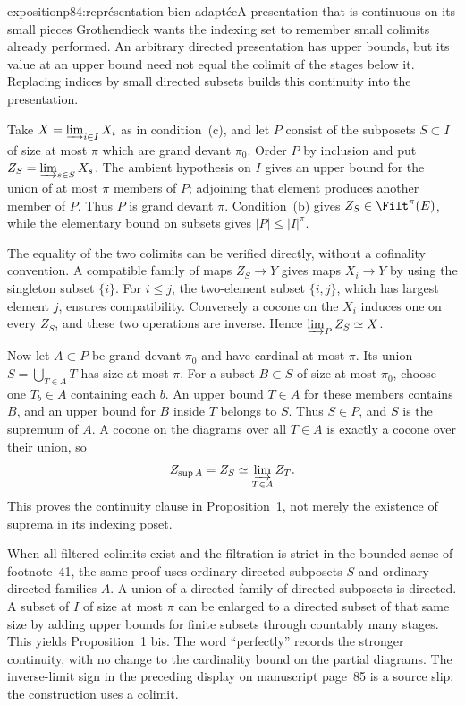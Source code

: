 \begin{dcomment}{exposition}{p84:représentation bien adaptée}{A presentation that is continuous on its small pieces}
Grothendieck wants the indexing set to remember small colimits already performed. An arbitrary directed presentation has upper bounds, but its value at an upper bound need not equal the colimit of the stages below it. Replacing indices by small directed subsets builds this continuity into the presentation.

Take $X=\varinjlim_{i\in I}X_i$ as in condition~(c), and let $P$ consist of the subposets $S\subset I$ of size at most $\pi$ which are grand devant $\pi_0$. Order $P$ by inclusion and put $Z_S=\varinjlim_{s\in S}X_s$. The ambient hypothesis on $I$ gives an upper bound for the union of at most $\pi$ members of $P$; adjoining that element produces another member of $P$. Thus $P$ is grand devant $\pi$. Condition~(b) gives $Z_S\in\Filt^\pi(E)$, while the elementary bound on subsets gives $|P|\leq|I|^\pi$.

The equality of the two colimits can be verified directly, without a cofinality convention. A compatible family of maps $Z_S\to Y$ gives maps $X_i\to Y$ by using the singleton subset $\{i\}$. For $i\leq j$, the two-element subset $\{i,j\}$, which has largest element $j$, ensures compatibility. Conversely a cocone on the $X_i$ induces one on every $Z_S$, and these two operations are inverse. Hence $\varinjlim_P Z_S\simeq X$.

Now let $A\subset P$ be grand devant $\pi_0$ and have cardinal at most $\pi$. Its union $S=\bigcup_{T\in A}T$ has size at most $\pi$. For a subset $B\subset S$ of size at most $\pi_0$, choose one $T_b\in A$ containing each $b$. An upper bound $T\in A$ for these members contains $B$, and an upper bound for $B$ inside $T$ belongs to $S$. Thus $S\in P$, and $S$ is the supremum of $A$. A cocone on the diagrams over all $T\in A$ is exactly a cocone over their union, so
\[
 Z_{\sup A}=Z_S\simeq\varinjlim_{T\in A}Z_T.
\]
This proves the continuity clause in Proposition~1, not merely the existence of suprema in its indexing poset.

When all filtered colimits exist and the filtration is strict in the bounded sense of footnote~41, the same proof uses ordinary directed subposets $S$ and ordinary directed families $A$. A union of a directed family of directed subposets is directed. A subset of $I$ of size at most $\pi$ can be enlarged to a directed subset of that same size by adding upper bounds for finite subsets through countably many stages. This yields Proposition~1 bis. The word ``perfectly'' records the stronger continuity, with no change to the cardinality bound on the partial diagrams. The inverse-limit sign in the preceding display on manuscript page~85 is a source slip: the construction uses a colimit.
\end{dcomment}

